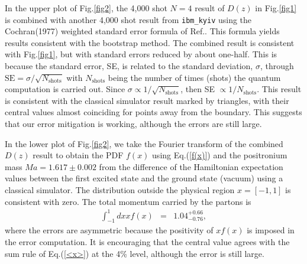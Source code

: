 \documentclass[aps,prd,twocolumn,tightenlines,superscriptaddress,
nofootinbib,preprintnumbers]{revtex4-1}
\newcommand{\Blue}[1]{\textcolor{black}{#1}}
\begin{document}
In the upper plot of Fig.\ref{fig2}, the 4,000 shot $N=4$ result of $D(z)$ 
in Fig.\ref{fig1} is 
combined with another 4,000 shot result from \texttt{ibm\_kyiv} using the Cochran(1977) weighted standard error formula of Ref.\cite{GATZ19951185}. This formula yields results consistent with the bootstrap method. The combined result is consistent with Fig.\ref{fig1}, but with standard errors reduced by about one-half. This is because the standard error, SE, is related to the standard deviation, $\sigma$, through $\text{SE}=\sigma/\sqrt{N_{\text{shots}}}$ with $N_{\text{shots}}$ being the number of times (shots) the quantum computation is carried out.
Since $\sigma\propto 1/\sqrt{N_{\text{shots}}}$, then SE $\propto 1/N_{\text{shots}}$. 
This result is consistent with the classical simulator result marked by triangles, with their central values almost coinciding for points away from the boundary. This suggests that our error mitigation is working, although the errors are still large. 
 

In the lower plot of Fig.\ref{fig2}, we take the Fourier transform of the combined $D(z)$ result to obtain the PDF $f(x)$ using Eq.(\ref{f(x)}) and the positronium mass
$M a=1.617\pm 0.002$ 
from the difference of the Hamiltonian expectation values between the first excited state and the ground state (vacuum) using a classical simulator.
The distribution outside the physical region $x=[-1,1]$ is consistent with zero. The total momentum carried by the partons is
\begin{eqnarray}
   \int_{-1}^{1}dx x f(x) &=& 1.04^{+0.66}_{-0.76} ,
\end{eqnarray}
where the errors are asymmetric because the positivity of $xf(x)$ is imposed in the error computation. It is encouraging that the central value agrees with the sum rule of Eq.(\ref{<x>}) at the 4\% level, although the error is still large.  
\end{document}
